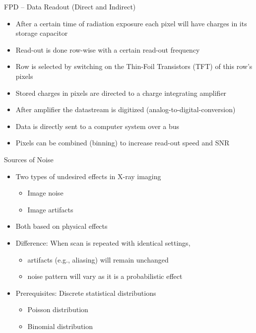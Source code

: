 \begin{frame}{FPD -- Data Readout (Direct and Indirect)}
    \begin{itemize}
        \vspace{0.2cm}
        \item After a certain time of radiation exposure each pixel will have charges in its storage capacitor
        \item Read-out is done row-wise with a certain read-out frequency
        \item Row is selected by switching on the Thin-Foil Transistors (TFT) of this row's pixels
        \item Stored charges in pixels are directed to a charge integrating amplifier
        \item After amplifier the datastream is digitized (analog-to-digital-conversion)
        \item Data is directly sent to a computer system over a bus
        \item Pixels can be combined (binning) to increase read-out speed and SNR
    \end{itemize}
\end{frame}

\begin{frame}{Sources of Noise}
    \begin{itemize}
        \vspace{0.3cm}
        \item Two types of undesired effects in X-ray imaging
              \begin{itemize}
                  \item Image noise
                  \item Image artifacts
              \end{itemize}
        \item Both based on physical effects
        \item Difference: When scan is repeated with identical settings,
              \begin{itemize}
                  \item artifacts (e.g., aliasing) will remain unchanged
                  \item noise pattern will vary as it is a probabilistic effect
              \end{itemize}
        \item Prerequisites: Discrete statistical distributions
              \begin{itemize}
                  \item Poisson distribution
                  \item Binomial distribution
              \end{itemize}
    \end{itemize}
\end{frame}

